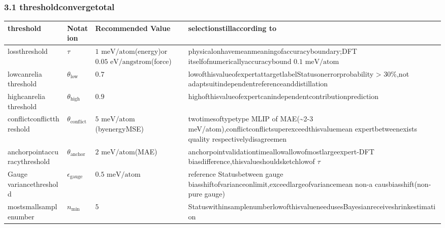 \documentclass[
  12pt,
]{article}
\begin{document}
\subsubsection{3.1 thresholdconvergetotal}\label{ux9608ux503cux6c47ux603b}

\begin{longtable}[]{@{}
  >{\raggedright\arraybackslash}p{}
  >{\raggedright\arraybackslash}p{}
  >{\raggedright\arraybackslash}p{}
  >{\raggedright\arraybackslash}p{}@{}}
\toprule\noalign{}
\begin{minipage}[b]{\linewidth}\raggedright
threshold
\end{minipage} & \begin{minipage}[b]{\linewidth}\raggedright
Notation
\end{minipage} & \begin{minipage}[b]{\linewidth}\raggedright
Recommended Value
\end{minipage} & \begin{minipage}[b]{\linewidth}\raggedright
selectionstillaccording to
\end{minipage} \\
\midrule\noalign{}
\endhead
\bottomrule\noalign{}
\endlastfoot
lossthreshold & \(\tau\) & \(1\text{ meV/atom}\)(energy)or
\(0.05\text{ eV/angstrom}\)(force) & physicalonhavemeanmeaningofaccuracyboundary;DFT
 itselfofnumericallyaccuracybound \(0.1\text{ meV/atom}\) \\
lowcanrelia threshold & \(\theta_{\text{low}}\) & \(0.7\) &
lowofthisvalueofexpertattargetlabelStatusonerrorprobability \textgreater{}
30\%,not adaptsuitindependentreferenceanddistillation \\
highcanrelia threshold & \(\theta_{\text{high}}\) & \(0.9\) &
highofthisvalueofexpertcanindependentcontributionprediction \\
conflictconflictthreshold & \(\theta_{\text{conflict}}\) &
\(5\text{ meV/atom}\)(byenergyMSE) & twotimesoftypetype MLIP of
MAE(\textasciitilde2-3
meV/atom),conflictconflictsuperexceedthisvaluemean  expertbetweenexists quality respectivelydisagreemen \\
anchorpointaccuracythreshold & \(\theta_{\text{anchor}}\) & \(2\text{ meV/atom}\)(MAE)
& anchorpointvalidationtimeallowallowofmostlargeexpert-DFT biasdifference,thisvalueshouldsketchlowof \(\tau\) \\
Gauge variancethreshold & \(\epsilon_{\text{gauge}}\) & \(0.5\text{ meV/atom}\) &
reference Statusbetween gauge biasshiftofvarianceonlimit,exceedlargeofvariancemean  non-a causbiasshift(non-pure
gauge) \\
mostsmallsamplenumber & \(n_{\min}\) & \(5\) &
StatuswithinsamplenumberlowofthisvalueneedusesBayesianreceiveshrinkestimation \\
\end{longtable}
\end{document}
